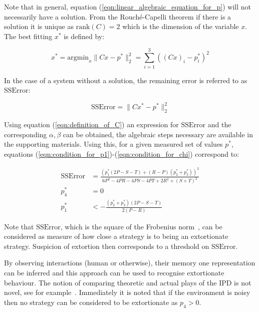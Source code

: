 \documentclass[a4paper]{article}
\begin{document}
Note that in general, equation (\ref{eqn:linear_algebraic_equation_for_p}) will
not necessarily have a solution. From the Rouch\'{e}-Capelli theorem if there is
a solution it is unique as \(\text{rank}(C)=2\) which is the dimension of the
variable \(x\). The best fitting \(x^*\) is defined by:

\begin{equation}\label{eqn:x_star}
    x^* = \text{argmin}_{x}\|C x- p^*\|_2^2 = \sum_{i=1}^{3}\left((C x)_i-p_i^*\right)^2
\end{equation}

In the case of a system without a solution, the remaining error is referred to
as \(\text{SSError}\):

\begin{equation}\label{eqn:r_squared}
    \text{SSError} = \|C x^*- p^*\|_2^2
\end{equation}

Using equation (\ref{eqn:definition_of_C}) an expression for  \(\text{SSError}\)
and the corresponding \(\alpha, \beta\) can be obtained, the algebraic steps
necessary are available in the supporting materials. Using this, for a given
measured set of values \(p^*\), equations
(\ref{eqn:condition_for_p1})-(\ref{eqn:condition_for_chi}) correspond to:

\begin{align}
    \text{SSError}   & =
        \frac{\left(p_1^* (2P-S-T) + (R-P)(p_2^* + p_3^*)\right) ^ 2}
             {6P^2 - 4PR -4PS -4PT + 2R^2 + (S + T) ^2}
             \label{eqn:measured_SSError}\\
    p_4^*            & = 0 \label{eqn:measured_condition_for_p4}\\
    p_1^*            & < -\frac{(p^*_2 + p^*_3)(2P - S - T)}{2(P - R)}
             \label{eqn:measured_condition_for_chi}
\end{align}

Note that \(\text{SSError}\), which is the square of the Frobenius
norm~\cite{Golub2013}, can be considered as measure of how close a strategy is
to being an extortionate strategy. Suspicion of extortion then corresponds to a
threshold on \(\text{SSError}\).

By observing interactions (human or otherwise), their memory one representation
can be inferred and this approach can be used to recognise extortionate
behaviour. The notion of comparing theoretic and actual plays of the IPD is not
novel, see for example~\cite{Rand2013}. Immediately it is noted that if the
environment is noisy~\cite{Wu1995} then no strategy can be considered to be
extortionate as \(p_4>0\).
\end{document}
